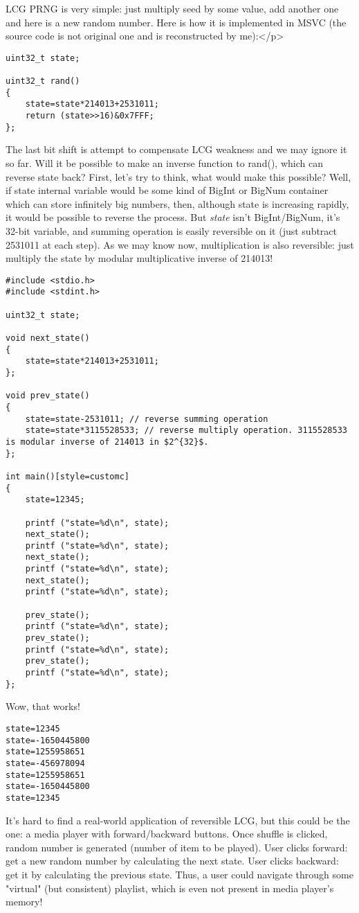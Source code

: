 
\ac{LCG} \ac{PRNG} is very simple: just multiply seed by some value, add another one and here is a new random number.
Here is how it is implemented in MSVC (the source code is not original one and is reconstructed by me):</p>

\begin{lstlisting}[style=customc]
uint32_t state;

uint32_t rand()
{
	state=state*214013+2531011;
	return (state>>16)&0x7FFF;
};
\end{lstlisting}

The last bit shift is attempt to compensate LCG weakness and we may ignore it so far.
Will it be possible to make an inverse function to rand(), which can reverse state back?
First, let's try to think, what would make this possible? Well, if state internal variable would be some kind of BigInt or BigNum container which can
store infinitely big numbers, then, although state is increasing rapidly, it would be possible to reverse the process.
But \textit{state} isn't BigInt/BigNum, it's 32-bit variable, and summing operation is easily reversible on it (just subtract 2531011 at each step).
As we may know now, multiplication is also reversible: just multiply the state by modular multiplicative inverse of 214013!

\begin{lstlisting}[style=customc]
#include <stdio.h>
#include <stdint.h>

uint32_t state;

void next_state()
{
	state=state*214013+2531011;
};

void prev_state()
{
	state=state-2531011; // reverse summing operation
	state=state*3115528533; // reverse multiply operation. 3115528533 is modular inverse of 214013 in $2^{32}$.
};

int main()[style=customc]
{
	state=12345;
	
	printf ("state=%d\n", state);
	next_state();
	printf ("state=%d\n", state);
	next_state();
	printf ("state=%d\n", state);
	next_state();
	printf ("state=%d\n", state);

	prev_state();
	printf ("state=%d\n", state);
	prev_state();
	printf ("state=%d\n", state);
	prev_state();
	printf ("state=%d\n", state);
};
\end{lstlisting}

Wow, that works!

\begin{lstlisting}
state=12345
state=-1650445800
state=1255958651
state=-456978094
state=1255958651
state=-1650445800
state=12345
\end{lstlisting}

It's hard to find a real-world application of reversible LCG, but this could be the one:
a media player with forward/backward buttons.
Once shuffle is clicked, random number is generated (number of item to be played).
User clicks forward: get a new random number by calculating the next state.
User clicks backward: get it by calculating the previous state.
Thus, a user could navigate through some "virtual" (but consistent) playlist, which is even not present in media player's memory!

